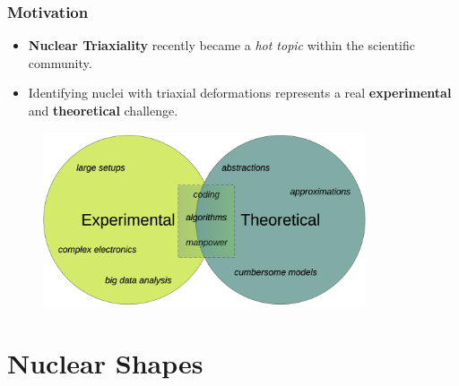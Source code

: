 \documentclass{beamer}
\begin{document}
\begin{frame}
	\frametitle{Motivation}
    \vspace{-0.2cm}
    \begin{itemize}
        \item \textbf{Nuclear Triaxiality} recently became a \emph{hot topic} within the scientific community.
        \item Identifying nuclei with triaxial deformations represents a real \textbf{experimental} and \textbf{theoretical} challenge.
    \end{itemize}
    \vspace{-0.2cm}
    \begin{figure}
        \centering
        \includegraphics[width=0.85\textwidth]{figures/exp_vs_theory.png}
    \end{figure}
\end{frame}

\section{Nuclear Shapes}
\end{document}
